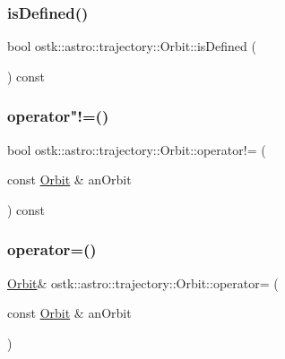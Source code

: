 \subsubsection{\texorpdfstring{is\+Defined()}{isDefined()}}
{\footnotesize\ttfamily bool ostk\+::astro\+::trajectory\+::\+Orbit\+::is\+Defined (\begin{DoxyParamCaption}{ }\end{DoxyParamCaption}) const}

\mbox{\label{classostk_1_1astro_1_1trajectory_1_1_orbit_a9c376b2163bc4fcca62abccaf03014d2}} 
\subsubsection{\texorpdfstring{operator"!=()}{operator!=()}}
{\footnotesize\ttfamily bool ostk\+::astro\+::trajectory\+::\+Orbit\+::operator!= (\begin{DoxyParamCaption}\item[{const \hyperlink{classostk_1_1astro_1_1trajectory_1_1_orbit}{Orbit} \&}]{an\+Orbit }\end{DoxyParamCaption}) const}

\mbox{\label{classostk_1_1astro_1_1trajectory_1_1_orbit_a1a6ea873bd7728fcd1fdf028c5b2c026}} 
\subsubsection{\texorpdfstring{operator=()}{operator=()}}
{\footnotesize\ttfamily \hyperlink{classostk_1_1astro_1_1trajectory_1_1_orbit}{Orbit}\& ostk\+::astro\+::trajectory\+::\+Orbit\+::operator= (\begin{DoxyParamCaption}\item[{const \hyperlink{classostk_1_1astro_1_1trajectory_1_1_orbit}{Orbit} \&}]{an\+Orbit }\end{DoxyParamCaption})\hspace{0.3cm}{\ttfamily [delete]}}

